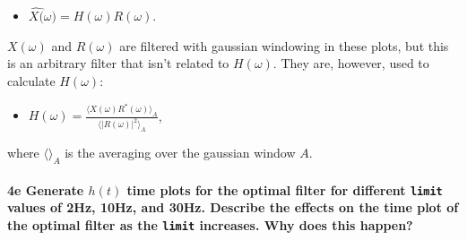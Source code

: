 \documentclass{article}
\begin{document}
\begin{itemize}
\itemsep1pt\parskip0pt
\item
  $\hat{X(}\omega) = H(\omega) R(\omega)$.
\end{itemize}

$X(\omega)$ and $R(\omega)$ are filtered with gaussian windowing in
these plots, but this is an arbitrary filter that isn't related to
$H(\omega)$. They are, however, used to calculate $H(\omega)$:

\begin{itemize}
\itemsep1pt\parskip0pt
\item
  $H(\omega)=\frac{\langle X(\omega) R^*(\omega) \rangle_A}{\langle |R(\omega)|^2\rangle_A}$,
\end{itemize}

where $\langle \rangle_A$ is the averaging over the gaussian window $A$.

    \paragraph{4e Generate $h(t)$ time plots for the optimal filter for
different \texttt{limit} values of 2Hz, 10Hz, and 30Hz. Describe the
effects on the time plot of the optimal filter as the \texttt{limit}
increases. Why does this
happen?}\label{e-generate-ht-time-plots-for-the-optimal-filter-for-different-limit-values-of-2hz-10hz-and-30hz.-describe-the-effects-on-the-time-plot-of-the-optimal-filter-as-the-limit-increases.-why-does-this-happen}
\end{document}
